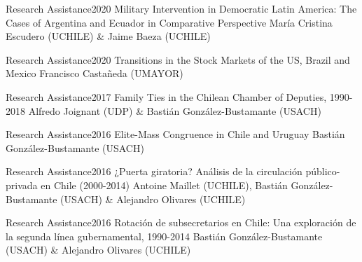 





\begin{projects}
	\project
	{Research Assistance}{2020}
	{Military Intervention in Democratic Latin America: The Cases of Argentina and Ecuador in Comparative Perspective}
	{María Cristina Escudero (UCHILE) \& Jaime Baeza (UCHILE)}

	\project
	{Research Assistance}{2020}
	{Transitions in the Stock Markets of the US, Brazil and Mexico}
	{Francisco Castañeda (UMAYOR)}
	

	\project
	{Research Assistance}{2017}
	{Family Ties in the Chilean Chamber of Deputies, 1990-2018}
	{Alfredo Joignant (UDP) \& Bastián González-Bustamante (USACH)}

	\project
	{Research Assistance}{2016}
	{Elite-Mass Congruence in Chile and Uruguay}
	{Bastián González-Bustamante (USACH)}
	
	\project
	{Research Assistance}{2016}
	{¿Puerta giratoria? Análisis de la circulación público-privada en Chile (2000-2014)}
	{Antoine Maillet (UCHILE), Bastián González-Bustamante (USACH) \& Alejandro Olivares (UCHILE)}

	\project
	{Research Assistance}{2016}
	{Rotación de subsecretarios en Chile: Una exploración de la segunda línea gubernamental, 1990-2014}
	{Bastián González-Bustamante (USACH) \& Alejandro Olivares (UCHILE)}
	
\end{projects}
